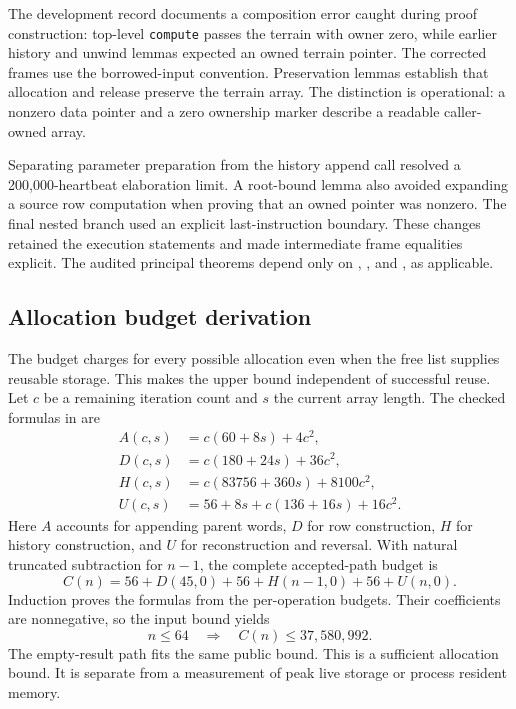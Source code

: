 \documentclass[11pt]{article}
\begin{document}
The development record documents a composition error caught during proof construction: top-level \textup{\texttt{compute}} passes the terrain with owner zero, while earlier history and unwind lemmas expected an owned terrain pointer.  The corrected frames use the borrowed-input convention.  Preservation lemmas establish that allocation and release preserve the terrain array.  The distinction is operational: a nonzero data pointer and a zero ownership marker describe a readable caller-owned array.

Separating parameter preparation from the history append call resolved a 200,000-heartbeat elaboration limit.  A root-bound lemma also avoided expanding a source row computation when proving that an owned pointer was nonzero.  The final nested branch used an explicit last-instruction boundary.  These changes retained the execution statements and made intermediate frame equalities explicit.  The audited principal theorems depend only on , , and , as applicable.

\subsection{Allocation budget derivation}

The budget charges for every possible allocation even when the free list supplies reusable storage.  This makes the upper bound independent of successful reuse.  Let $c$ be a remaining iteration count and $s$ the current array length.  The checked formulas in  are
\begin{align*}
 A(c,s)&=c(60+8s)+4c^2,\\
 D(c,s)&=c(180+24s)+36c^2,\\
 H(c,s)&=c(83756+360s)+8100c^2,\\
 U(c,s)&=56+8s+c(136+16s)+16c^2.
\end{align*}
Here $A$ accounts for appending parent words, $D$ for row construction, $H$ for history construction, and $U$ for reconstruction and reversal.  With natural truncated subtraction for $n-1$, the complete accepted-path budget is
\[
 C(n)=56+D(45,0)+56+H(n-1,0)+56+U(n,0).
\]
Induction proves the formulas from the per-operation budgets.  Their coefficients are nonnegative, so the input bound yields
\[
 n\leq64\quad\Longrightarrow\quad C(n)\leq37{,}580{,}992.
\]
The empty-result path fits the same public bound.  This is a sufficient allocation bound.  It is separate from a measurement of peak live storage or process resident memory.
\end{document}
